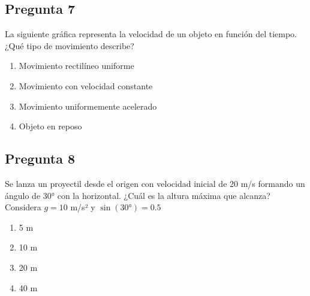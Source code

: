 \begin{preguntabox}
\subsection{Pregunta 7}
La siguiente gráfica representa la velocidad de un objeto en función del tiempo. ¿Qué tipo de movimiento describe?

\begin{center}
\end{center}

\begin{enumerate}
    \item[A)] Movimiento rectilíneo uniforme
    \item[B)] Movimiento con velocidad constante
    \item[C)] Movimiento uniformemente acelerado
    \item[D)] Objeto en reposo
\end{enumerate}
\end{preguntabox}

\begin{preguntabox}
\subsection{Pregunta 8}
Se lanza un proyectil desde el origen con velocidad inicial de 20 m/s formando un ángulo de 30° con la horizontal. ¿Cuál es la altura máxima que alcanza?\\
Considera $g = 10$ m/s² y $\sin(30°) = 0.5$

\begin{enumerate}
    \item[A)] 5 m
    \item[B)] 10 m
    \item[C)] 20 m
    \item[D)] 40 m
\end{enumerate}
\end{preguntabox}

